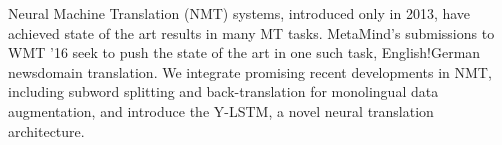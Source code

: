 Neural Machine Translation (NMT) systems, introduced only in 2013, have achieved state of the art results in many MT tasks. MetaMind's submissions to WMT '16 seek to push the state of the art in one such task, English!German newsdomain translation. We integrate promising recent developments in NMT, including subword splitting and back-translation for monolingual data augmentation, and introduce the Y-LSTM, a novel neural translation architecture.
